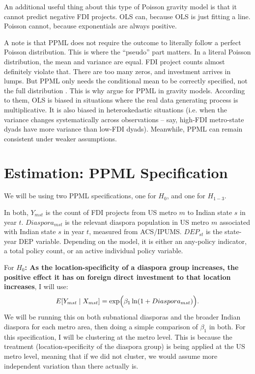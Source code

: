 \documentclass[doublespace,nopageskip]{UVAthesis}
\begin{document}
    An additional useful thing about this type of Poisson gravity model is that it cannot predict negative FDI projects. OLS can, because OLS is just fitting a line. Poisson cannot, because exponentials are always positive. 

    A note is that PPML does not require the outcome to literally follow a perfect Poisson distribution. This is where the ``pseudo'' part matters. In a literal Poisson distribution, the mean and variance are equal. FDI project counts almost definitely violate that. There are too many zeros, and investment arrives in lumps. But PPML only needs the conditional mean to be correctly specified, not the full distribution \citep{gourieroux_pseudo_1984, wooldridge_distribution-free_1999}. This is why \citep{santos_silva_log_2006} argue for PPML in gravity models. According to them, OLS is biased in situations where the real data generating process is multiplicative. It is also biased in heteroskedastic situations (i.e. when the variance changes systematically across observations -- say, high-FDI metro-state dyads have more variance than low-FDI dyads). Meanwhile, PPML can remain consistent under weaker assumptions. 

\section{Estimation: PPML Specification} \label{ss:specification}

We will be using two PPML specifications, one for $H_0$, and one for $H_{1-3}$. 

In both, $Y_{mst}$ is the count of FDI projects from US metro $m$ to Indian state $s$ in year $t$. $Diaspora_{mst}$ is the relevant diaspora population in US metro $m$ associated with Indian state $s$ in year $t$, measured from ACS/IPUMS. $DEP_{st}$ is the state-year DEP variable. Depending on the model, it is either an any-policy indicator, a total policy count, or an active individual policy variable.

For \textbf{$H_0$:  As the location-specificity of a diaspora group increases, the positive effect it has on foreign direct investment to that location increases}, I will use:
\[
E[Y_{mst} \mid X_{mst}] =
\exp \Bigl(
\beta_1 \ln(1+Diaspora_{mst})
\Bigr).
\]
We will be running this on both subnational diasporas and the broader Indian diaspora for each metro area, then doing a simple  comparison of $\beta_1$ in both. For this specification, I will be clustering at the metro level. This is because the treatment (location-specificity of the diaspora group) is being applied at the US metro level, meaning that if we did not cluster, we would assume more independent variation than there actually is.
\end{document}
